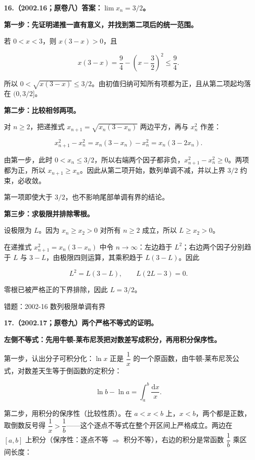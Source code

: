 \documentclass[UTF8,11pt,fontset=windows]{ctexart}
\begin{document}
\textbf{16.（2002.16；原卷八）答案：$\lim x_n=3/2$。}

\textbf{第一步：先证明递推一直有意义，并找到第二项后的统一范围。}

若 $0<x<3$，则 $x(3-x)>0$，且

$$
x(3-x)=\frac94-\left(x-\frac32\right)^2\le\frac94.
$$

所以 $0<\sqrt{x(3-x)}\le3/2$。由初值归纳可知所有项都为正，且从第二项起均落在 $(0,3/2]$。

\textbf{第二步：比较相邻两项。}

对 $n\ge2$，把递推式 $x_{n+1}=\sqrt{x_n(3-x_n)}$ 两边平方，再与 $x_n^2$ 作差：

$$
x_{n+1}^2-x_n^2=x_n(3-x_n)-x_n^2=x_n(3-2x_n).
$$

由第一步，此时 $0<x_n\le3/2$，所以右端两个因子都非负，$x_{n+1}^2-x_n^2\ge0$。两项都为正，所以 $x_{n+1}\ge x_n$。因此从第二项开始，数列单调不减，并以上界 $3/2$ 约束，必收敛。

第一项即使大于 $3/2$，也不影响尾部单调有界的结论。

\textbf{第三步：求极限并排除零根。}

设极限为 $L$。因为 $x_n\ge x_2>0$ 对所有 $n\ge2$ 成立，所以 $L\ge x_2>0$。

在递推式 $x_{n+1}^2=x_n(3-x_n)$ 中令 $n\to\infty$：左边趋于 $L^2$；右边两个因子分别趋于 $L$ 与 $3-L$，由极限四则运算，其乘积趋于 $L(3-L)$。因此

$$
L^2=L(3-L),\qquad L(2L-3)=0.
$$

零根已被严格正的下界排除，因此 $L=3/2$。

\begingroup\color{gray}错题：2002-16 数列极限单调有界\par\endgroup

\clearpage

\textbf{17.（2002.17；原卷九）两个严格不等式的证明。}

\textbf{左侧不等式：先用牛顿-莱布尼茨把对数差写成积分，再用积分保序性。}

第一步，认出分子可积分化：$\ln x$ 正是 $\dfrac1x$ 的一个原函数，由牛顿-莱布尼茨公式，对数差天生等于倒函数的定积分：

$$
\ln b-\ln a=\int_a^b\frac{\mathrm dx}{x}.
$$

第二步，用积分的保序性（比较性质）。在 $a<x<b$ 上，$x<b$，两个都是正数，取倒数反号得 $\dfrac1x>\dfrac1b$——这个逐点不等式在整个开区间上严格成立。两边在 $[a,b]$ 上积分（保序性：逐点不等 $\Rightarrow$ 积分不等），右边的积分是常函数 $\dfrac1b$ 乘区间长度：
\end{document}
